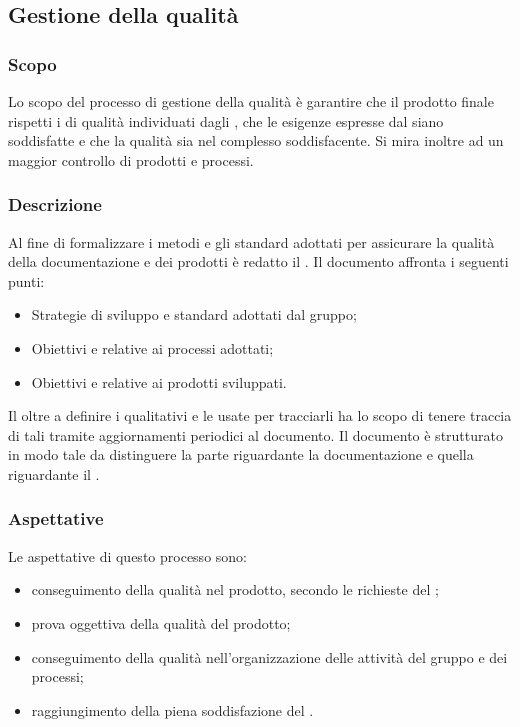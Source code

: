 \subsection{Gestione della qualità}
\subsubsection{Scopo}
Lo scopo del processo di gestione della qualità è garantire che il prodotto finale rispetti i  di qualità individuati dagli , che le esigenze espresse dal  siano soddisfatte e che la qualità sia nel complesso soddisfacente. Si mira inoltre ad un maggior controllo di prodotti e processi.
\subsubsection{Descrizione}
Al fine di formalizzare i metodi e gli standard adottati per assicurare la qualità della documentazione e dei prodotti è redatto il \PdQ{}.
Il documento affronta i seguenti punti:
\begin{itemize}
\item Strategie di sviluppo e standard adottati dal gruppo;
\item Obiettivi e  relative ai processi adottati;
\item Obiettivi e  relative ai prodotti sviluppati.
\end{itemize}
Il \PdQ{} oltre a definire i  qualitativi e le  usate per tracciarli ha lo scopo di tenere traccia di tali  tramite aggiornamenti periodici al documento.
Il documento è strutturato in modo tale da distinguere la parte riguardante la documentazione e quella riguardante il .
\subsubsection{Aspettative}
Le aspettative di questo processo sono:
\begin{itemize}
	\item conseguimento della qualità nel prodotto, secondo le richieste del \textit{};
	\item prova oggettiva della qualità del prodotto;
	\item conseguimento della qualità nell'organizzazione delle attività del gruppo e dei processi;
	\item raggiungimento della piena soddisfazione del .
\end{itemize}
